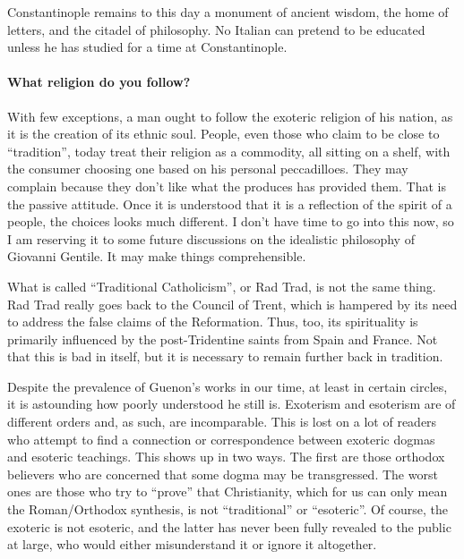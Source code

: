 \begin{quotex}
Constantinople remains to this day a monument of ancient wisdom, the home of letters, and the citadel of philosophy. No Italian can pretend to be educated unless he has studied for a time at Constantinople.
\end{quotex}


\paragraph{What religion do you follow?}


With few exceptions, a man ought to follow the exoteric religion of his nation, as it is the creation of its ethnic soul. People, even those who claim to be close to ``tradition'', today treat their religion as a commodity, all sitting on a shelf, with the consumer choosing one based on his personal peccadilloes. They may complain because they don't like what the produces has provided them. That is the passive attitude. Once it is understood that it is a reflection of the spirit of a people, the choices looks much different. I don't have time to go into this now, so I am reserving it to some future discussions on the idealistic philosophy of Giovanni Gentile. It may make things comprehensible.

What is called ``Traditional Catholicism'', or Rad Trad, is not the same thing. Rad Trad really goes back to the Council of Trent, which is hampered by its need to address the false claims of the Reformation. Thus, too, its spirituality is primarily influenced by the post-Tridentine saints from Spain and France. Not that this is bad in itself, but it is necessary to remain further back in tradition.

Despite the prevalence of Guenon's works in our time, at least in certain circles, it is astounding how poorly understood he still is. Exoterism and esoterism are of different orders and, as such, are incomparable. This is lost on a lot of readers who attempt to find a connection or correspondence between exoteric dogmas and esoteric teachings. This shows up in two ways. The first are those orthodox believers who are concerned that some dogma may be transgressed. The worst ones are those who try to ``prove'' that Christianity, which for us can only mean the Roman/Orthodox synthesis, is not ``traditional'' or ``esoteric''. Of course, the exoteric is not esoteric, and the latter has never been fully revealed to the public at large, who would either misunderstand it or ignore it altogether.

